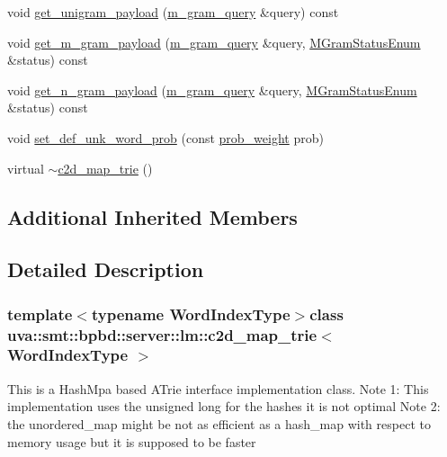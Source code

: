 \begin{DoxyCompactItemize}
\item 
void \hyperlink{classuva_1_1smt_1_1bpbd_1_1server_1_1lm_1_1c2d__map__trie_a44781d54d85062a3a3f52ad0918161f4}{get\+\_\+unigram\+\_\+payload} (\hyperlink{classuva_1_1smt_1_1bpbd_1_1server_1_1lm_1_1m__gram__query}{m\+\_\+gram\+\_\+query} \&query) const 
\item 
void \hyperlink{classuva_1_1smt_1_1bpbd_1_1server_1_1lm_1_1c2d__map__trie_ae6fbdacab6bcd49ba2a2e5d1943c84bf}{get\+\_\+m\+\_\+gram\+\_\+payload} (\hyperlink{classuva_1_1smt_1_1bpbd_1_1server_1_1lm_1_1m__gram__query}{m\+\_\+gram\+\_\+query} \&query, \hyperlink{namespaceuva_1_1smt_1_1bpbd_1_1server_1_1lm_ab9b3e7382b561dcb8abcd6b55e9b796a}{M\+Gram\+Status\+Enum} \&status) const 
\item 
void \hyperlink{classuva_1_1smt_1_1bpbd_1_1server_1_1lm_1_1c2d__map__trie_a7353153b7421eb3e5f9c0c50d5d6d81a}{get\+\_\+n\+\_\+gram\+\_\+payload} (\hyperlink{classuva_1_1smt_1_1bpbd_1_1server_1_1lm_1_1m__gram__query}{m\+\_\+gram\+\_\+query} \&query, \hyperlink{namespaceuva_1_1smt_1_1bpbd_1_1server_1_1lm_ab9b3e7382b561dcb8abcd6b55e9b796a}{M\+Gram\+Status\+Enum} \&status) const 
\item 
void \hyperlink{classuva_1_1smt_1_1bpbd_1_1server_1_1lm_1_1c2d__map__trie_a6919b8b5dbe190b7e2418a62cb162595}{set\+\_\+def\+\_\+unk\+\_\+word\+\_\+prob} (const \hyperlink{namespaceuva_1_1smt_1_1bpbd_1_1server_a01e9ea4de9c226f4464862e84ff0bbcc}{prob\+\_\+weight} prob)
\item 
virtual \hyperlink{classuva_1_1smt_1_1bpbd_1_1server_1_1lm_1_1c2d__map__trie_aa3bfd3e83196287a2ef3f9cea2914ac2}{$\sim$c2d\+\_\+map\+\_\+trie} ()
\end{DoxyCompactItemize}
\subsection*{Additional Inherited Members}


\subsection{Detailed Description}
\subsubsection*{template$<$typename Word\+Index\+Type$>$class uva\+::smt\+::bpbd\+::server\+::lm\+::c2d\+\_\+map\+\_\+trie$<$ Word\+Index\+Type $>$}

This is a Hash\+Mpa based A\+Trie interface implementation class. Note 1\+: This implementation uses the unsigned long for the hashes it is not optimal Note 2\+: the unordered\+\_\+map might be not as efficient as a hash\+\_\+map with respect to memory usage but it is supposed to be faster

